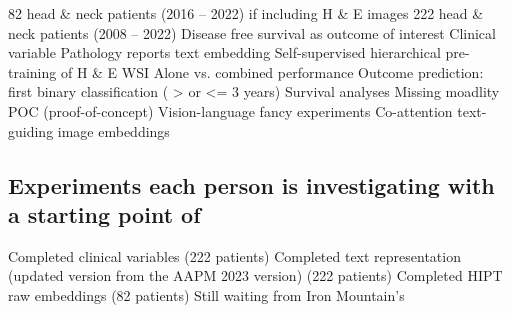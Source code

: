 \documentclass{article}%
\begin{document}
%
82 head \& neck patients (2016 – 2022) if including H \& E images%
\newline%
\newline%
%
222 head \& neck patients (2008 – 2022)%
\newline%
\newline%
%
Disease free survival as outcome of interest%
\newline%
\newline%
%
Clinical variable%
\newline%
\newline%
%
Pathology reports text embedding%
\newline%
\newline%
%
Self{-}supervised hierarchical pre{-}training of H \& E WSI%
\newline%
\newline%
%
Alone vs. combined performance%
\newline%
\newline%
%
Outcome prediction: first binary classification ( > or <= 3 years)%
\newline%
\newline%
%
Survival analyses%
\newline%
\newline%
%
Missing moadlity POC (proof{-}of{-}concept) %
\newline%
\newline%
%
Vision{-}language fancy experiments %
\newline%
\newline%
%
Co{-}attention text{-}guiding image embeddings %
\newline%
\newline%
%
%
\newline%
\newline%
%
%
\newline%
\newline%
%
\subsection{Experiments each person is investigating with a starting point of }%
\label{subsec:Experimentseachpersonisinvestigatingwithastartingpointof}%

%
Completed clinical variables (222 patients) %
\newline%
\newline%
%
Completed text representation (updated version from the AAPM 2023 version) (222 patients) %
\newline%
\newline%
%
Completed HIPT raw embeddings (82 patients) %
\newline%
\newline%
%
Still waiting from Iron Mountain’s%
\newline%
\newline%
%
\end{document}
